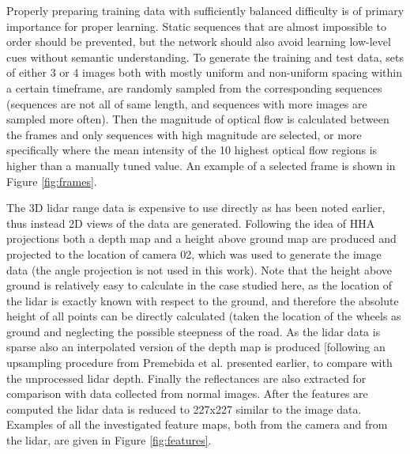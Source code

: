 Properly preparing training data with sufficiently balanced difficulty is of primary importance for proper learning. Static sequences that are almost impossible to order should be prevented, but the network should also avoid learning low-level cues without semantic understanding. To generate the training and test data, sets of either 3 or 4 images both with mostly uniform and non-uniform spacing within a certain timeframe, are randomly sampled from the corresponding sequences (sequences are not all of same length, and sequences with more images are sampled more often). Then the magnitude of optical flow is calculated between the frames and only sequences with high magnitude are selected\cite{misra2016}, or more specifically where the mean intensity of the 10 highest optical flow regions is higher than a manually tuned value. An example of a selected frame is shown in Figure \ref{fig:frames}.


The 3D lidar range data is expensive to use directly as has been noted earlier, thus instead 2D views of the data are generated. Following the idea of HHA projections both a depth map and a height above ground map are produced and projected to the location of camera 02, which was used to generate the image data (the angle projection is not used in this work). Note that the height above ground is relatively easy to calculate in the case studied here, as the location of the lidar is exactly known with respect to the ground, and therefore the absolute height of all points can be directly calculated (taken the location of the wheels as ground and neglecting the possible steepness of the road. As the lidar data is sparse also an interpolated version of the depth map is produced [following an upsampling procedure from Premebida et al.\cite{premebida2014} presented earlier, to compare with the unprocessed lidar depth. Finally the reflectances are also extracted for comparison with data collected from normal images. After the features are computed the lidar data is reduced to 227x227 similar to the image data. Examples of all the investigated feature maps, both from the camera and from the lidar, are given in Figure \ref{fig:features}.

